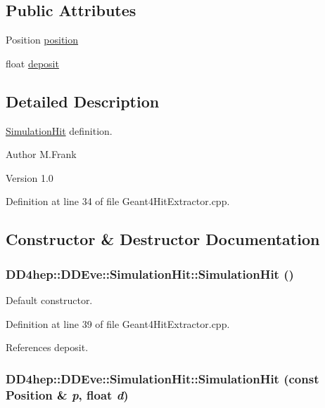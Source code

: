 \subsection*{Public Attributes}
\begin{DoxyCompactItemize}
\item 
Position \hyperlink{class_d_d4hep_1_1_d_d_eve_1_1_simulation_hit_a3ac34457c4fec010a96bdd309c14544c}{position}
\item 
float \hyperlink{class_d_d4hep_1_1_d_d_eve_1_1_simulation_hit_a96d56e1a81de2176ab0e856ba6394799}{deposit}
\end{DoxyCompactItemize}


\subsection{Detailed Description}
\hyperlink{class_d_d4hep_1_1_d_d_eve_1_1_simulation_hit}{SimulationHit} definition. \begin{DoxyAuthor}{Author}
M.Frank 
\end{DoxyAuthor}
\begin{DoxyVersion}{Version}
1.0 
\end{DoxyVersion}


Definition at line 34 of file Geant4HitExtractor.cpp.

\subsection{Constructor \& Destructor Documentation}
\hypertarget{class_d_d4hep_1_1_d_d_eve_1_1_simulation_hit_a52422ccbc4cabcf550a4295a3ae69fac}{
\subsubsection[{SimulationHit}]{\setlength{\rightskip}{0pt plus 5cm}DD4hep::DDEve::SimulationHit::SimulationHit ()}}
\label{class_d_d4hep_1_1_d_d_eve_1_1_simulation_hit_a52422ccbc4cabcf550a4295a3ae69fac}


Default constructor. 

Definition at line 39 of file Geant4HitExtractor.cpp.

References deposit.\hypertarget{class_d_d4hep_1_1_d_d_eve_1_1_simulation_hit_a6374a26cae5bd1a3d4aeca8059872df1}{
\subsubsection[{SimulationHit}]{\setlength{\rightskip}{0pt plus 5cm}DD4hep::DDEve::SimulationHit::SimulationHit (const Position \& {\em p}, \/  float {\em d})}}
\label{class_d_d4hep_1_1_d_d_eve_1_1_simulation_hit_a6374a26cae5bd1a3d4aeca8059872df1}


